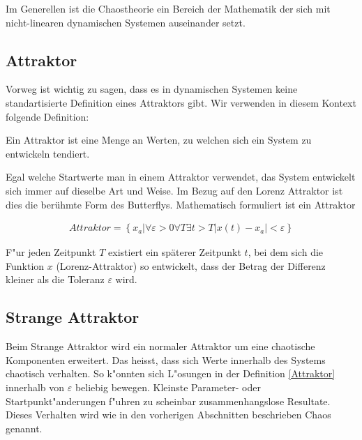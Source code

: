 Im Generellen ist die Chaostheorie ein Bereich der Mathematik der sich mit nicht-linearen dynamischen Systemen auseinander setzt.


\subsection{Attraktor}

Vorweg ist wichtig zu sagen, dass es in dynamischen Systemen keine standartisierte Definition eines Attraktors gibt. Wir verwenden in diesem Kontext folgende Definition: 
\begin{center}
	Ein Attraktor ist eine Menge an Werten, zu welchen sich ein System zu entwickeln tendiert.
\end{center} Egal welche Startwerte man in einem Attraktor verwendet, das System entwickelt sich immer auf dieselbe Art und Weise. Im Bezug auf den Lorenz Attraktor ist dies die berühmte Form des Butterflys. Mathematisch formuliert ist ein Attraktor 

\begin{align}
\label{Attraktor}Attraktor = \left\{ x_a | \forall \varepsilon > 0
\forall T \exists t > T
|x(t) - x_a| < \varepsilon \right\} 
\end{align}

F"ur jeden Zeitpunkt $T$ existiert ein späterer Zeitpunkt $t$, bei dem sich die Funktion $x$ (Lorenz-Attraktor) so entwickelt, dass der Betrag der Differenz kleiner als die Toleranz $\varepsilon$ wird.

\subsection{Strange Attraktor}
Beim Strange Attraktor wird ein normaler Attraktor um eine chaotische Komponenten erweitert. Das heisst, dass sich Werte innerhalb des Systems chaotisch verhalten. So k"onnten sich L"osungen in der Definition \eqref{Attraktor} innerhalb von $\varepsilon$ beliebig bewegen. Kleinste Parameter- oder Startpunkt"anderungen f"uhren zu scheinbar zusammenhangslose Resultate. Dieses Verhalten wird wie in den vorherigen Abschnitten beschrieben Chaos genannt.
